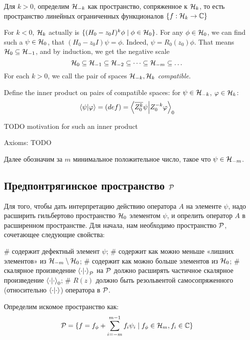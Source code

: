Для $k > 0$, определим $\mathcal{H}_{-k}$ как пространство, сопряженное к $\mathcal{H}_{k}$, то есть пространство линейных ограниченных функционалов $\{ f: \mathcal{H}_{k} \to \mathbb{C} \}$


For $k < 0$, $\mathcal{H}_{k}$ actually is $\{ (H_0 - z_0 I)^k \phi \mid \phi \in \mathcal{H}_{0} \}$.
For any $\phi \in \mathcal{H}_{0}$, we can find such a $\psi \in \mathcal{H}_{0}$, that $(H_0 - z_0 I) \psi = \phi$. Indeed, $\psi = R_0(z_0) \phi$. That means $\mathcal{H}_{0} \subseteq \mathcal{H}_{-1}$, and by induction, we get the negative scale
\[
\mathcal{H}_{0} \subseteq \mathcal{H}_{-1} \subseteq \mathcal{H}_{-2} \subseteq \dots \subseteq \mathcal{H}_{-m} \subseteq \dots
\] 
For each $k > 0$, we call the pair of spaces $\mathcal{H}_{-k}, \mathcal{H}_{k}$ \textit{compatible}.

Define the inner product on pairs of compatible spaces: for $\psi \in \mathcal{H}_{-k}$, $\varphi \in \mathcal{H}_{k}$:
\[
\ip{\psi}{\varphi} = (def) = \ip{\cconj{Z_0^k} \psi}{Z_0^{-k} \varphi}_0
\]

TODO motivation for such an inner product

Axioms: TODO


Далее обозначим за $m$ минимальное положительное число, такое что $\psi \in \mathcal{H}_{-m}$.

\subsection{Предпонтрягинское пространство $\mathcal{P}$}
Для того, чтобы дать интерпретацию действию оператора $A$ на элементе $\psi$, надо расширить гильбертово пространство $\mathcal{H}_{0}$ элементом $\psi$, и опрелить оператор $A$ в расширенном пространстве. Для начала, нам необходимо пространство $\mathcal{P}$, сочетающее следующие свойства:

\begin{elist}
# содержит дефектный элемент $\psi$;
# содержит как можно меньше «лишних элементов» из  $\mathcal{H}_{-m} \setminus \mathcal{H}_{0}$;
# содержит как можно больше элементов из $\mathcal{H}_{0}$;
# скалярное произведение $\ipcdot_\mcP$ на $\mathcal{P}$ должно расширять частичное скалярное произведение $\ipcdot_0$;
# $R(z)$ должно быть резольвентой самосопряженного (относительно $\ipcdot$) оператора в $\mathcal{P}$.
\end{elist}

Определим искомое пространство как:
\[
\mathcal{P} = 
\{ f = f_\phi + \sum\limits_{i = -m}^{m - 1} f_i \psi_i \mid f_\phi \in \mathcal{H}_{m}, f_i \in \mathbb{C}\}
\]

